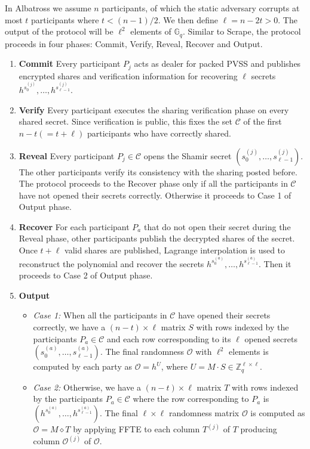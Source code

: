 \documentclass[letterpaper,twocolumn,10pt]{article}
\theoremstyle{definition}
\theoremstyle{remark}
\begin{document}
In Albatross we assume $n$ participants, of which the static adversary corrupts at most $t$ participants where $t<(n-1)/2$. We then define $\ell = n-2t >0 $. The output of the protocol will be $\ell^2$ elements of $\mathbb{G}_q$. Similar to Scrape, the protocol proceeds in four phases: Commit, Verify, Reveal, Recover and Output.
\begin{enumerate}
    \item \textbf{Commit} Every participant $P_j$ acts as dealer for packed PVSS and publishes encrypted shares and verification information for recovering $\ell$ secrets $h^{s^{(j)}_{0}}, \ldots, h^{s^{(j)}_{\ell-1}}$.
    \item \textbf{Verify} Every participant executes the sharing verification phase on every shared secret. Since verification is public, this fixes the set $\mathcal{C}$ of the first $n-t (= t + \ell)$ participants who have correctly shared.
    \item \textbf{Reveal} Every participant $P_j \in \mathcal{C}$ opens the Shamir secret $(s^{(j)}_{0}, \ldots, s^{(j)}_{\ell-1})$. The other participants verify its consistency with the sharing posted before. The protocol proceeds to the Recover phase only if all the participants in $\mathcal{C}$ have not opened their secrets correctly. Otherwise it proceeds to Case 1 of Output phase.
    \item \textbf{Recover} For each participant $P_a$ that do not open their secret during the Reveal phase, other participants publish the decrypted shares of the secret. Once $t+\ell$ valid shares are published, Lagrange interpolation is used to reconstruct the polynomial and recover the secrets $h^{s^{(a)}_{0}}, \ldots, h^{s^{(a)}_{\ell-1}}$. Then it proceeds to Case 2 of Output phase.
    \item \textbf{Output}
        \begin{itemize}
            \item \textit{Case 1:} When all the participants in $\mathcal{C}$ have opened their secrets correctly, we have a $(n-t) \times \ell$ matrix $S$ with rows indexed by the participants  $P_a \in \mathcal{C}$ and each row corresponding to its $\ell$ opened secrets $(s^{(a)}_{0}, \ldots, s^{(a)}_{\ell-1})$. The final randomness $\mathcal{O}$ with $\ell^2$ elements is computed by each party as $\mathcal{O} = h^U$, where $U = M \cdot S \in \mathbb{Z}_q^{\ell \times \ell}$.
            
            \item \textit{Case 2:} Otherwise, we have a $(n-t) \times \ell$ matrix $T$ with rows indexed by the participants  $P_a \in \mathcal{C}$ where the row corresponding to $P_a$ is $(h^{s^{(a)}_{0}}, \ldots, h^{s^{(a)}_{\ell-1}})$. The final $\ell \times \ell$ randomness matrix $\mathcal{O}$ is computed as $\mathcal{O} = M \diamond T$ by applying FFTE to each column $T^{(j)}$ of $T$ producing column $\mathcal{O}^{(j)}$ of $\mathcal{O}$.
        \end{itemize}
\end{enumerate}
\end{document}
